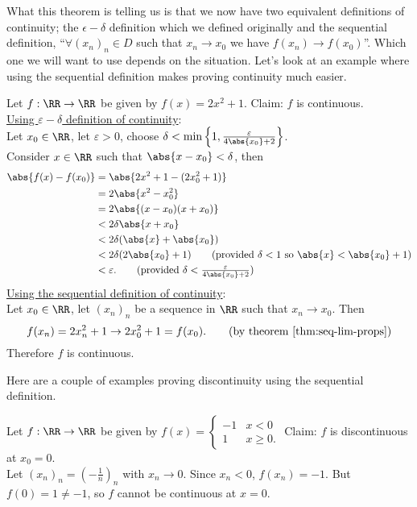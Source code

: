 \documentclass[../real_analysis.tex]{subfiles}
\begin{document}
            What this theorem is telling us is that we now have two equivalent definitions of continuity; the $\epsilon-\delta$ definition which we defined originally and the sequential definition, ``$\forall(x_n)_n\in D$ such that $x_n\to x_0$ we have $f(x_n)\to f(x_0)$''. Which one we will want to use depends on the situation. Let's look at an example where using the sequential definition makes proving continuity much easier.
            \begin{example}
                Let $f: \RR\to\RR$ be given by $f(x)=2x^2+1$. Claim: $f$ is continuous.\\
                \underline{Using $\varepsilon-\delta$ definition of continuity}:\\
                Let $x_0\in\RR$, let $\varepsilon>0$, choose $\delta<\min\left\{1, \frac{\varepsilon}{4\abs{x_0}+2}\right\}$.\\
                Consider $x\in\RR$ such that $\abs{x-x_0}<\delta$, then
                \begin{align}
                    \abs{f(x)-f(x_0)}&=\abs{2x^2+1-(2x_0^2+1)}\\
                    &=2\abs{x^2-x_0^2}\\
                    &=2\abs{(x-x_0)(x+x_0)}\\
                    &<2\delta\abs{x+x_0}\\
                    &<2\delta(\abs{x}+\abs{x_0})\\
                    &<2\delta(2\abs{x_0}+1)\tag{provided $\delta<1$ so $\abs{x}<\abs{x_0}+1$}\\
                    &<\varepsilon.\tag{provided $\delta<\frac{\varepsilon}{4\abs{x_0}+2}$}
                \end{align}
                \underline{Using the sequential definition of continuity}:\\
                Let $x_0\in\RR$, let $(x_n)_n$ be a sequence in $\RR$ such that $x_n\to x_0$. Then
                \begin{equation}
                    f(x_n)=2x_n^2+1\to2x_0^2+1=f(x_0).\tag{by theorem \ref{thm:seq-lim-props}}
                \end{equation}
                Therefore $f$ is continuous.
            \end{example}
            Here are a couple of examples proving discontinuity using the sequential definition.
            \begin{example}
                Let $f: \RR\to\RR$ be given by $f(x)=\begin{cases}
                    -1 & x<0\\
                    1 & x\geq0.
                \end{cases}$ Claim: $f$ is discontinuous at $x_0=0$.\\
                Let $(x_n)_n=\left(-\frac{1}{n}\right)_n$ with $x_n\to0$. Since $x_n<0$, $f(x_n)=-1$. But $f(0)=1\neq-1$, so $f$ cannot be continuous at $x=0$.
            \end{example}
\end{document}
